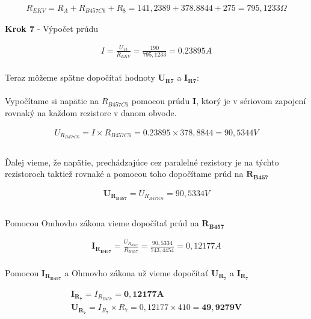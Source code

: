 \begin{gather*}
    R_{EKV} = R_{A} + R_{B457C6} + R_{8} = 141,2389 + 378.8844 + 275 = 795,1233 \Omega
\end{gather*}

\newpage

\begin{center}
\textbf{Krok 7} - Výpočet prúdu
\end{center}

\begin{gather*}
   I = \frac {U_{12}} {R_{EKV}} = \frac {190} {795,1233} = 0.23895 A \\
\end{gather*}

\noindent Teraz môžeme spätne dopočítať hodnoty $\boldsymbol{U_{R7}}$ a $\boldsymbol{I_{R7}}$:
\\\\
Vypočítame si napätie na $R_{B457C6}$ pomocou prúdu $\boldsymbol{I}$, ktorý je v sériovom zapojení rovnaký na každom rezistore v danom obvode.

\begin{gather*}
    U_{R_{B457C6}} = I \times R_{B457C6} = 0.23895 \times 378,8844 = 90,5344 V \\\\
\end{gather*}

\noindent Ďalej vieme, že napätie, prechádzajúce cez paralelné rezistory je na týchto rezistoroch taktiež rovnaké a pomocou toho dopočítame prúd na $\boldsymbol{R_{B457}}$

\begin{gather*}
    \boldsymbol{U_{R_{B457}}} = U_{R_{B457C6}} = 90,5334 V \\\\
\end{gather*}

\noindent Pomocou Omhovho zákona vieme dopočítať prúd na $\boldsymbol{R_{B457}}$

\begin{gather*}
   \boldsymbol{I_{R_{B457}}} = \frac {U_{R_{B457}}} {R_{B457}} = \frac{90,5334} {743,4454} = 0,12177 A \\
\end{gather*}

\noindent Pomocou $\boldsymbol{I_{R_{B457}}}$ a Ohmovho zákona už vieme dopočítať $\boldsymbol{U_{R_{7}}}$ a $\boldsymbol{I_{R_{7}}}$

\begin{gather*}
   \boldsymbol{I_{R_{7}}} = I_{R_{B457}} = \boldsymbol{0,12177 A} \\
   \boldsymbol{U_{R_{7}}} = I_{R_{7}} \times {R_{7}} = 0,12177 \times 410 = \boldsymbol{49,9279 V} \\\\
\end{gather*}

 

